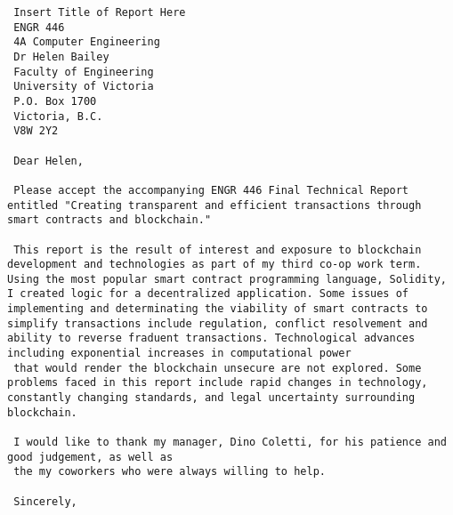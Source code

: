  \linespread{1}
 \begin{verbatim}
 Insert Title of Report Here
 ENGR 446
 4A Computer Engineering 
 Dr Helen Bailey
 Faculty of Engineering
 University of Victoria
 P.O. Box 1700
 Victoria, B.C.
 V8W 2Y2
 
 Dear Helen, 
 
 Please accept the accompanying ENGR 446 Final Technical Report entitled "Creating transparent and efficient transactions through smart contracts and blockchain."
 
 This report is the result of interest and exposure to blockchain development and technologies as part of my third co-op work term. Using the most popular smart contract programming language, Solidity, I created logic for a decentralized application. Some issues of implementing and determinating the viability of smart contracts to simplify transactions include regulation, conflict resolvement and ability to reverse fraduent transactions. Technological advances including exponential increases in computational power 
 that would render the blockchain unsecure are not explored. Some problems faced in this report include rapid changes in technology, constantly changing standards, and legal uncertainty surrounding blockchain.
 
 I would like to thank my manager, Dino Coletti, for his patience and good judgement, as well as
 the my coworkers who were always willing to help.
 
 Sincerely,

 \end{verbatim}
 \fancyhf{} %
